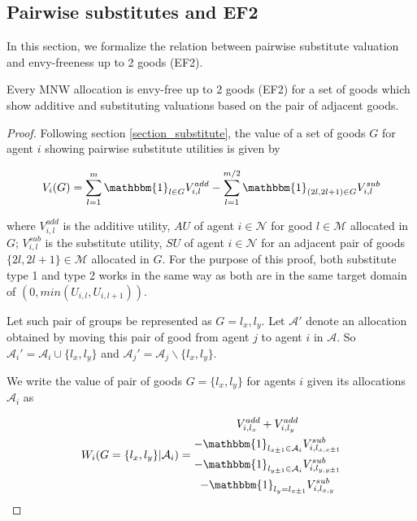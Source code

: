 
\subsection{Pairwise substitutes and EF2}
\label{subsection_EF2_subst}

In this section, we formalize the relation between pairwise substitute valuation and envy-freeness up to 2 goods (EF2).

\begin{theorem}
Every MNW allocation is envy-free up to 2 goods (EF2) for a set of goods which show additive and substituting valuations based on the pair of adjacent goods.
\end{theorem}

\begin{proof}

Following section \ref{section_substitute}, the value of a set of goods $G$ for agent $i$ showing pairwise substitute utilities is given by

\[
    V_i(G) = \sum_{l=1}^m \mathbbm{1}_{l \in G}V_{i,l}^{add} - \sum_{l=1}^{m/2} \mathbbm{1}_{\left(2l,2l+1\right) \in G}V_{i,l}^{sub}
\]

where $V_{i,l}^{add}$ is the additive utility, $AU$ of agent $i \in \mathcal{N}$ for good $l \in \mathcal{M}$ allocated in $G$; $V_{i,l}^{sub}$ is the substitute utility, $SU$ of agent $i \in \mathcal{N}$ for an adjacent pair of goods $\{2l,2l+1\} \in \mathcal{M}$ allocated in $G$. For the purpose of this proof, both substitute type 1 and type 2 works in the same way as both are in the same target domain of $(0, min(U_{i,l}, U_{i,l+1}))$.

Let such pair of groups be represented as $G = {l_x, l_y}$. Let $\mathcal{A}'$ denote an allocation obtained by moving this pair of good from agent $j$ to agent $i$ in $\mathcal{A}$. So $\mathcal{A}_i' = \mathcal{A}_i \cup \{l_x, l_y\}$ and $\mathcal{A}_j' = \mathcal{A}_j\backslash \{l_x, l_y\}$.

We write the value of pair of goods $G = \{l_x, l_y\}$ for agents $i$ given its allocations $\mathcal{A}_i$ as

\begin{equation}
\label{eq_val_given_alloc_subst}
    W_i(G=\{l_x,l_y\} | \mathcal{A}_i) = 
    \begin{gathered}
        V_{i,l_x}^{add} + V_{i,l_y}^{add} \\
        - \mathbbm{1}_{l_{x \pm 1} \in \mathcal{A}_i}V_{i,l_{x,x\pm 1}}^{sub} \\
        - \mathbbm{1}_{l_{y \pm 1} \in \mathcal{A}_i}V_{i,l_{y,y\pm 1}}^{sub} \\
        - \mathbbm{1}_{l_y = l_{x \pm 1}}V_{i,l_{x,y}}^{sub}
    \end{gathered}
\end{equation}


\end{proof}

